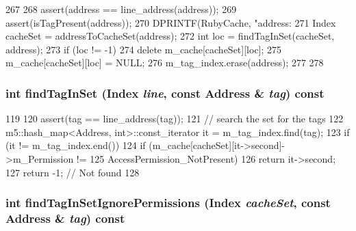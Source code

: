 \begin{DoxyCode}
267 {
268     assert(address == line_address(address));
269     assert(isTagPresent(address));
270     DPRINTF(RubyCache, "address: %
271     Index cacheSet = addressToCacheSet(address);
272     int loc = findTagInSet(cacheSet, address);
273     if (loc != -1) {
274         delete m_cache[cacheSet][loc];
275         m_cache[cacheSet][loc] = NULL;
276         m_tag_index.erase(address);
277     }
278 }
\end{DoxyCode}
\hypertarget{classCacheMemory_ac32dac48596332a7537a1e3c31cfd3c0}{
\subsubsection[{findTagInSet}]{\setlength{\rightskip}{0pt plus 5cm}int findTagInSet ({\bf Index} {\em line}, \/  const {\bf Address} \& {\em tag}) const}}
\label{classCacheMemory_ac32dac48596332a7537a1e3c31cfd3c0}



\begin{DoxyCode}
119 {
120     assert(tag == line_address(tag));
121     // search the set for the tags
122     m5::hash_map<Address, int>::const_iterator it = m_tag_index.find(tag);
123     if (it != m_tag_index.end())
124         if (m_cache[cacheSet][it->second]->m_Permission !=
125             AccessPermission_NotPresent)
126             return it->second;
127     return -1; // Not found
128 }
\end{DoxyCode}
\hypertarget{classCacheMemory_ad7d6ceb226fbf63dc2c91a61aa57d98a}{
\subsubsection[{findTagInSetIgnorePermissions}]{\setlength{\rightskip}{0pt plus 5cm}int findTagInSetIgnorePermissions ({\bf Index} {\em cacheSet}, \/  const {\bf Address} \& {\em tag}) const}}
\label{classCacheMemory_ad7d6ceb226fbf63dc2c91a61aa57d98a}



